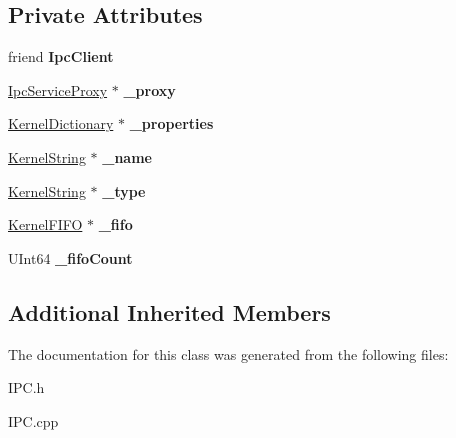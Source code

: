 \subsection*{Private Attributes}
\begin{DoxyCompactItemize}
\item 
\mbox{\label{class_ipc_service_a2cc3062376872535da7acaad43d2ca4e}} 
friend {\bfseries Ipc\+Client}
\item 
\mbox{\label{class_ipc_service_a29512da85956bfe1ed0df3da2a08b472}} 
\hyperlink{class_ipc_service_proxy}{Ipc\+Service\+Proxy} $\ast$ {\bfseries \+\_\+proxy}
\item 
\mbox{\label{class_ipc_service_af0b9a9dafacff815aaf757a6f172efbe}} 
\hyperlink{class_kernel_dictionary}{Kernel\+Dictionary} $\ast$ {\bfseries \+\_\+properties}
\item 
\mbox{\label{class_ipc_service_aabbb968191370b1dcb3eca360db6f794}} 
\hyperlink{class_kernel_string}{Kernel\+String} $\ast$ {\bfseries \+\_\+name}
\item 
\mbox{\label{class_ipc_service_a7d99b3e1ac61f27eb38561aa97cbc075}} 
\hyperlink{class_kernel_string}{Kernel\+String} $\ast$ {\bfseries \+\_\+type}
\item 
\mbox{\label{class_ipc_service_a7e930415d89140574289979576abf29a}} 
\hyperlink{class_kernel_f_i_f_o}{Kernel\+F\+I\+FO} $\ast$ {\bfseries \+\_\+fifo}
\item 
\mbox{\label{class_ipc_service_a9a8afb7e9aab1c20b9b8f1f076fab15d}} 
U\+Int64 {\bfseries \+\_\+fifo\+Count}
\end{DoxyCompactItemize}
\subsection*{Additional Inherited Members}


The documentation for this class was generated from the following files\+:\begin{DoxyCompactItemize}
\item 
I\+P\+C.\+h\item 
I\+P\+C.\+cpp\end{DoxyCompactItemize}
